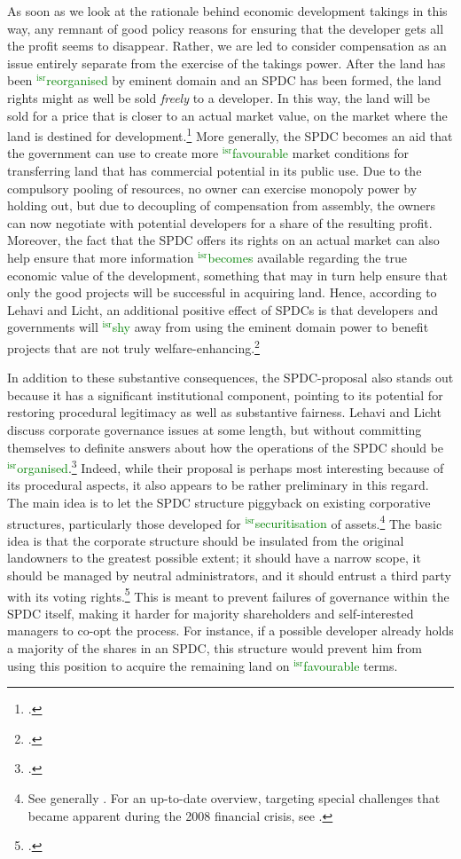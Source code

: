 \documentclass[12pt,a4paper]{book} %
\newcommand{\isr}[1]{\textcolor{green}{$^{\textrm{isr}}${#1}}}
\begin{document}
As soon as we look at the rationale behind economic development takings in this way, any remnant of good policy reasons for ensuring that the developer gets all the profit seems to disappear. Rather, we are led to consider compensation as an issue entirely separate from the exercise of the takings power. After the land has been \isr{reorganised} by eminent domain and an SPDC has been formed, the land rights might as well be sold {\it freely} to a developer. In this way, the land will be sold for a price that is closer to an actual market value, on the market where the land is destined for development.\footcite[1735-1736]{lehavi07} More generally, the SPDC becomes an aid that the government can use to create more \isr{favourable} market conditions for transferring land that has commercial potential in its public use. Due to the compulsory pooling of resources, no owner can exercise monopoly power by holding out, but due to decoupling of compensation from assembly, the owners can now negotiate with potential developers for a share of the resulting profit. Moreover, the fact that the SPDC offers its rights on an actual market can also help ensure that more information \isr{becomes} available regarding the true economic value of the development, something that may in turn help ensure that only the good projects will be successful in acquiring land. Hence, according to Lehavi and Licht, an additional positive effect of SPDCs is that developers and governments will \isr{shy }away from using the eminent domain power to benefit projects that are not truly welfare-enhancing.\footcite[1735-1736]{lehavi07}

In addition to these substantive consequences, the SPDC-proposal also stands out because it has a significant institutional component, pointing to its potential for restoring procedural legitimacy as well as substantive fairness. Lehavi and Licht discuss corporate governance issues at some length, but without committing themselves to definite answers about how the operations of the SPDC should be \isr{organised}.\footcite[1040-1048]{lehavi07} Indeed, while their proposal is perhaps most interesting because of its procedural aspects, it also appears to be rather preliminary in this regard. The main idea is to let the SPDC structure piggyback on existing corporative structures, particularly those developed for \isr{securitisation} of assets.\footnote{See generally \cite{schwarcz94}. For an up-to-date overview, targeting special challenges that became apparent during the 2008 financial crisis, see \cite{schwarcz13}.} The basic idea is that the corporate structure should be insulated from the original landowners to the greatest possible extent; it should have a narrow scope, it should be managed by neutral administrators, and it should entrust a third party with its voting rights.\footcite[1742]{lehavi07} This is meant to prevent failures of governance within the SPDC itself, making it harder for majority shareholders and self-interested managers to co-opt the process. For instance, if a possible developer already holds a majority of the shares in an SPDC, this structure would prevent him from using this position to acquire the remaining land on \isr{favourable} terms. 
\end{document}

